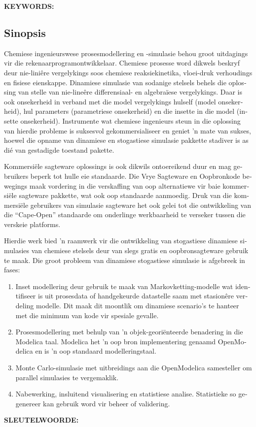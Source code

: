 \noindent \textbf{KEYWORDS: } 

\begin{otherlanguage}{afrikaans}
\chapter*{Sinopsis}
Chemiese ingenieurswese prosesmodellering en -simulasie behou groot uitdagings vir die rekenaarprogramontwikkelaar. 
Chemiese prosesse word dikwels beskryf deur nie-lini\^ere vergelykings soos chemiese reaksiekinetika, vloei-druk verhoudings en fisiese eienskappe. 
Dinamiese simulasie van sodanige stelsels behels die oplossing van stelle van nie-line\^ere differensiaal- en algebra\"iese vergelykings. 
Daar is ook onsekerheid in verband met die model vergelykings hulself (model onsekerheid), hul parameters (parametriese onsekerheid) en die insette in die model (insette onsekerheid). 
Instrumente wat chemiese ingenieurs steun in die oplossing van hierdie probleme is suksesvol gekommersialiseer en geniet 'n mate van sukses, hoewel die opname van dinamiese en stogastiese simulasie pakkette stadiver is as di\'e van gestadigde toestand pakette.

Kommersi\"ele sagteware oplossings is ook dikwils ontoereikend duur en mag gebruikers beperk tot hulle eie standaarde. 
Die Vrye Sagteware en Oopbronkode bewegings maak vordering in die verskaffing van oop alternatiewe vir baie kommersi\"ele sagteware pakkette, wat ook oop standaarde aanmoedig.
Druk van die kommersi\"ele gebruikers van simulasie sagteware het ook gelei tot die ontwikkeling van die ``Cape-Open'' standaarde om onderlinge werkbaarheid te verseker tussen die verskeie platforms. 

Hierdie werk bied 'n raamwerk vir die ontwikkeling van stogastiese dinamiese simulasies van chemiese stelsels deur van slegs  gratis en oopbronsagteware gebruik te maak. 
Die groot probleem van dinamiese stogastiese simulasie is afgebreek in fases:
\begin{enumerate}
\item Inset modellering deur gebruik te maak van Markovketting-modelle wat identifiseer is uit prosesdata of handgekeurde datastelle saam met stasion\^ere verdeling modelle.
  Dit maak dit moontlik om dinamiese scenario's te hanteer met die minimum van kode vir spesiale gevalle.
\item Prosesmodellering met behulp van 'n objek-geori\"enteerde benadering in die Modelica taal.
  Modelica het 'n oop bron implementering genaamd OpenModelica en is 'n oop standaard modelleringstaal.
\item Monte Carlo-simulasie met uitbreidings aan die OpenModelica samesteller om parallel simulasies te vergemaklik.
\item Nabewerking, insluitend visualisering en statistiese analise.
  Statistieke so gegenereer kan gebruik word vir beheer of validering.
\end{enumerate}

\bigskip 

\noindent \textbf{SLEUTELWOORDE:} 

\end{otherlanguage} 


